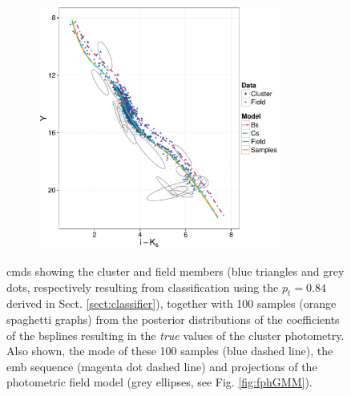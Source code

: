 \begin{figure}[ht!]
\begin{subfigure}[t]{0.48\textwidth}
        \caption{}   
    \end{subfigure}
     \begin{subfigure}[t]{0.48\textwidth}
      \includegraphics[page=4,height=8cm,width=\textwidth]{background/Figures/BHM/CMDs.pdf}
        \caption{}
    \end{subfigure}
\caption{\glspl{cmd} showing the cluster and field members (blue triangles and grey dots, respectively resulting from classification using the $p_t = 0.84$ derived in Sect. \ref{sect:classifier}), together with 100 samples (orange spaghetti graphs) from the posterior distributions of the coefficients of the \glspl{bspline} resulting in the \emph{true} values of the cluster photometry. Also shown, the mode of these 100 samples (blue dashed line), the \gls{emb} sequence (magenta dot dashed line) and projections of the photometric field model (grey ellipses, see Fig. \ref{fig:fphGMM}).}
\label{fig:CMDs_results}
\end{figure}

